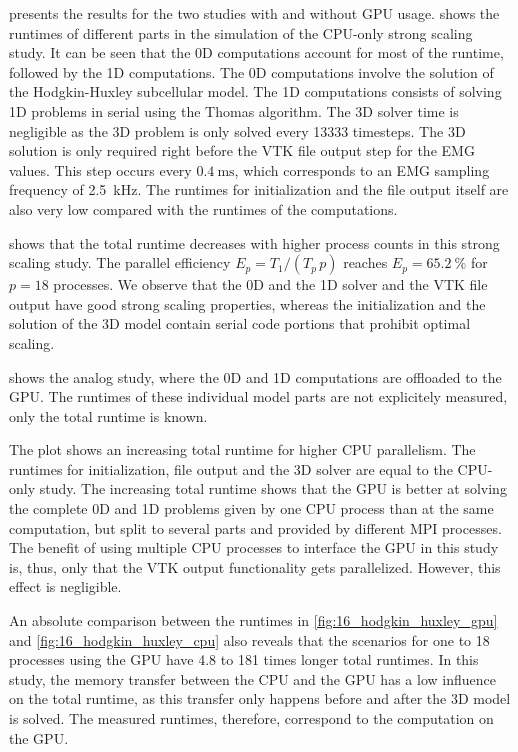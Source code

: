  presents the results for the two studies with and without GPU usage.  shows the runtimes of different parts in the simulation of the CPU-only strong scaling study. It can be seen that the 0D computations account for most of the runtime, followed by the 1D computations. The 0D computations involve the solution of the Hodgkin-Huxley subcellular model. The 1D computations consists of solving 1D problems in serial using the Thomas algorithm. The 3D solver time is negligible as the 3D problem is only solved every \num{13333} timesteps. The 3D solution is only required right before the VTK file output step for the EMG values. This step occurs every $\SI{0.4}{\ms}$, which corresponds to an EMG sampling frequency of \SI{2.5}{\kilo\hertz}.
The runtimes for initialization and the file output itself are also very low compared with the runtimes of the computations.

 shows that the total runtime decreases with higher process counts in this strong scaling study. The parallel efficiency $E_p = T_1/(T_p\,p)$ reaches $E_p=\SI{65.2}{\percent}$ for $p=18$ processes. We observe that the 0D and the 1D solver and the VTK file output have good strong scaling properties, whereas the initialization and the solution of the 3D model contain serial code portions that prohibit optimal scaling.

 shows the analog study, where the 0D and 1D computations are offloaded to the GPU. The runtimes of these individual model parts are not explicitely measured, only the total runtime is known.

The plot shows an increasing total runtime for higher CPU parallelism. 
The runtimes for initialization, file output and the 3D solver are equal to the CPU-only study.
The increasing total runtime shows that the GPU is better at solving the complete 0D and 1D problems 
given by one CPU process than at the same computation, but split to several parts and provided by different MPI processes. 
The benefit of using multiple CPU processes to interface the GPU in this study is, thus, only that the VTK output functionality gets parallelized. However, this effect is negligible.

An absolute comparison between the runtimes in \cref{fig:16_hodgkin_huxley_gpu} and \cref{fig:16_hodgkin_huxley_cpu} also reveals that the scenarios for one to 18 processes using the GPU have 4.8 to 181 times longer total runtimes. In this study, the memory transfer between the CPU and the GPU has a low influence on the total runtime, as this transfer only happens before and after the 3D model is solved. The measured runtimes, therefore, correspond to the computation on the GPU.

